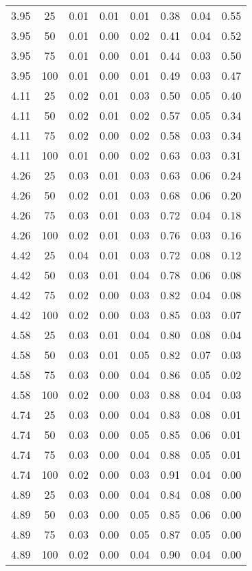 \documentclass[iop,usenatbib]{emulateapj}
\begin{document}
\begin{table}
{\begin{tabular}{cccccccc}
3.95 & 25 & 0.01 & 0.01 & 0.01 & 0.38 & 0.04 & 0.55 \\
3.95 & 50 & 0.01 & 0.00 & 0.02 & 0.41 & 0.04 & 0.52 \\
3.95 & 75 & 0.01 & 0.00 & 0.01 & 0.44 & 0.03 & 0.50 \\
3.95 & 100 & 0.01 & 0.00 & 0.01 & 0.49 & 0.03 & 0.47 \\
4.11 & 25 & 0.02 & 0.01 & 0.03 & 0.50 & 0.05 & 0.40 \\
4.11 & 50 & 0.02 & 0.01 & 0.02 & 0.57 & 0.05 & 0.34 \\
4.11 & 75 & 0.02 & 0.00 & 0.02 & 0.58 & 0.03 & 0.34 \\
4.11 & 100 & 0.01 & 0.00 & 0.02 & 0.63 & 0.03 & 0.31 \\
4.26 & 25 & 0.03 & 0.01 & 0.03 & 0.63 & 0.06 & 0.24 \\
4.26 & 50 & 0.02 & 0.01 & 0.03 & 0.68 & 0.06 & 0.20 \\
4.26 & 75 & 0.03 & 0.01 & 0.03 & 0.72 & 0.04 & 0.18 \\
4.26 & 100 & 0.02 & 0.01 & 0.03 & 0.76 & 0.03 & 0.16 \\
4.42 & 25 & 0.04 & 0.01 & 0.03 & 0.72 & 0.08 & 0.12 \\
4.42 & 50 & 0.03 & 0.01 & 0.04 & 0.78 & 0.06 & 0.08 \\
4.42 & 75 & 0.02 & 0.00 & 0.03 & 0.82 & 0.04 & 0.08 \\
4.42 & 100 & 0.02 & 0.00 & 0.03 & 0.85 & 0.03 & 0.07 \\
4.58 & 25 & 0.03 & 0.01 & 0.04 & 0.80 & 0.08 & 0.04 \\
4.58 & 50 & 0.03 & 0.01 & 0.05 & 0.82 & 0.07 & 0.03 \\
4.58 & 75 & 0.03 & 0.00 & 0.04 & 0.86 & 0.05 & 0.02 \\
4.58 & 100 & 0.02 & 0.00 & 0.03 & 0.88 & 0.04 & 0.03 \\
4.74 & 25 & 0.03 & 0.00 & 0.04 & 0.83 & 0.08 & 0.01 \\
4.74 & 50 & 0.03 & 0.00 & 0.05 & 0.85 & 0.06 & 0.01 \\
4.74 & 75 & 0.03 & 0.00 & 0.04 & 0.88 & 0.05 & 0.01 \\
4.74 & 100 & 0.02 & 0.00 & 0.03 & 0.91 & 0.04 & 0.00 \\
4.89 & 25 & 0.03 & 0.00 & 0.04 & 0.84 & 0.08 & 0.00 \\
4.89 & 50 & 0.03 & 0.00 & 0.05 & 0.85 & 0.06 & 0.00 \\
4.89 & 75 & 0.03 & 0.00 & 0.05 & 0.87 & 0.05 & 0.00 \\
4.89 & 100 & 0.02 & 0.00 & 0.04 & 0.90 & 0.04 & 0.00 \\

\end{tabular}}
\end{table}
\end{document}
